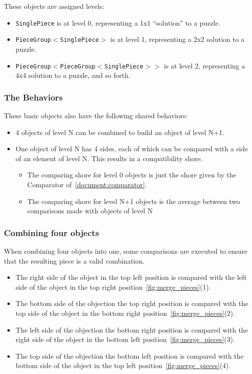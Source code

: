\documentclass{article}
\begin{document}
These objects are assigned levels:
\begin{itemize}
\item \texttt{SinglePiece} is at level 0, representing a 1x1 ``solution'' to a puzzle.
\item \texttt{PieceGroup\(<\)SinglePiece\(>\)} is at level 1, representing a 2x2 solution to a puzzle.
\item \texttt{PieceGroup\(<\)PieceGroup\(<\)SinglePiece\(>>\)} is at level 2, representing a 4x4 solution to a puzzle, and so forth.
\end{itemize}

\subsubsection{The Behaviors}

These basic objects also have the following shared behaviors:
\begin{itemize}
  \item 4 objects of level N can be combined to build an object of level N+1.
  \item One object of level N has 4 sides, each of which can be compared with a side of an element of level N. This results in a compatibility shore.
  \begin{itemize}
    \item The comparing shore for level 0 objects is just the shore given by the Comparator of~\cref{document:comparator}.
    \item The comparing shore for level N+1 objects is the average between two comparisons made with objects of level N
  \end{itemize}
\end{itemize}

\subsubsection{Combining four objects}\label{document:combining_four_objects}
When combining four objects into one, some comparisons are executed to
ensure that the resulting piece is a valid  combination.

\begin{itemize}
  \item The right side of the object in the top left position is compared with the left side of the object in the top right position~\cref{fig:merge_pieces}(1).
  \item The bottom side of the objection the top right position is compared with the top side of the object in the bottom right position~\cref{fig:merge_pieces}(2).
  \item The left side of the objection the bottom right position is compared with the right side of the object in the bottom left position~\cref{fig:merge_pieces}(3).
  \item The top side of the objection the bottom left position is compared with the bottom side of the object in the top left position~\cref{fig:merge_pieces}(4).
\end{itemize}
\end{document}
